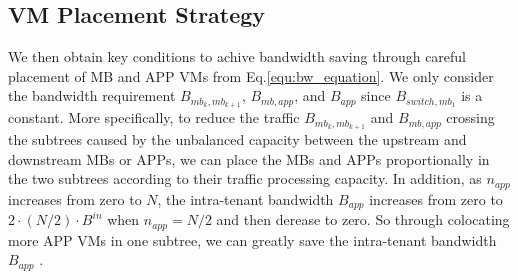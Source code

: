 \documentclass[review]{elsarticle}
\begin{document}
\subsection{VM Placement Strategy}



We then obtain key conditions to achive bandwidth saving through careful placement of MB and APP VMs from Eq.\ref{equ:bw_equation}. We only consider the bandwidth requirement $B_{mb_k,mb_{k+1}}$, $B_{mb,app}$, and $B_{app}$ since $B_{switch,mb_1}$ is a constant. 
More specifically, to reduce the traffic $B_{mb_k,mb_{k+1}}$ and $B_{mb,app}$ crossing the subtrees caused by the unbalanced capacity between the upstream and downstream MBs or APPs, we can place the MBs and APPs proportionally in the two subtrees according to their traffic processing capacity. In addition, as $n_{app}$ increases from zero to $N$, the intra-tenant bandwidth $B_{app}$ increases from zero to $2\cdot (N/2)\cdot B^{in}$ when $n_{app} = N/2$ and then derease to zero. So through colocating more APP VMs in one subtree, we can greatly save the intra-tenant bandwidth $B_{app}$ . 
\end{document}
